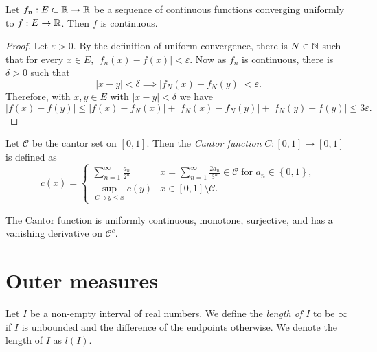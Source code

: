 
\begin{theorem}[]
	Let $f_n: E \subset \mathbb{R} \to \mathbb{R}$ be a sequence of continuous functions
	converging uniformly to $f: E \to \mathbb{R}$.
	Then $f$ is continuous.
\end{theorem}

\begin{proof}
	Let $\varepsilon > 0$.
	By the definition of uniform convergence, there is $N \in \mathbb{N}$ such that
	for every $x \in E$, $\left\lvert f_n(x) - f(x) \right\rvert < \varepsilon$.
	Now as $f_n$ is continuous, there is $\delta > 0$ such that
	\[
		\left\lvert x - y \right\rvert < \delta
		\implies
		\left\lvert f_N(x) - f_N(y) \right\rvert < \varepsilon.
	\]
	Therefore, with $x,y \in E$ with $\left\lvert x - y \right\rvert < \delta$
	we have
	\[
		\left\lvert f(x) - f(y) \right\rvert
		\leq \left\lvert f(x) - f_N(x) \right\rvert
		+ \left\lvert f_N(x) - f_N(y) \right\rvert
		+ \left\lvert f_N(y) - f(y) \right\rvert
		\leq 3 \varepsilon.
	\]
\end{proof}

\begin{definition}
	Let $\mathcal C$ be the cantor set on $[0,1]$.
	Then the \emph{Cantor function}  $C: [0,1] \to [0,1]$
	is defined as
	\[
		c(x) =
		\begin{cases}
			\sum_{n=1}^\infty \frac{a_n}{2^n} &
				x = \sum_{n=1}^\infty \frac{2a_n}{3^n} \in \mathcal C
				\;\text{for $a_n \in \left\{
					0,1
				\right\}$}, \\
			\sup_{C \ni y \leq x} c(y) &
				x \in [0,1] \setminus \mathcal C.
		\end{cases}
	\]
\end{definition}

\begin{theorem}[]
	The Cantor function is uniformly continuous, monotone, surjective, and
	has a vanishing derivative on $\mathcal C^c$.
\end{theorem}

\section{Outer measures}

\begin{definition}
	Let $I$ be a non-empty interval of real numbers.
	We define the \emph{length of $I$} to be $\infty$ if $I$ is unbounded
	and the difference of the endpoints otherwise. We denote the length of
	$I$ as $l(I)$.
\end{definition}

